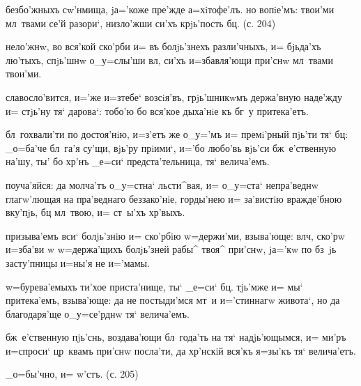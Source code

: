 безбо'жныхъ сw'нмища, jа='коже пре'жде а=хiтофе'лъ. но 
вопiе'мъ: твои'ми мл~твами се'й разори`, низло'жши си'хъ 
крjь'пость бц. (с. 204)

нело'жнw, во вся'кой ско'рби и= въ болjь'знехъ 
разли'чныхъ, и= бjьда'хъ лю'тыхъ, спjь'шнw о_у=слы'ши 
вл, си'хъ и=збавля'ющи при'снw мл~твами твои'ми.

славосло'вится, и='же и=з\ъ тебе` возсiя'въ, грjь'шникwмъ 
держа'вную наде'жду и= стjь'ну тя` дарова`: тобо'ю бо 
вся'кое дыха'нiе къ бг~у притека'етъ.


бл~гохвали'ти по достоя'нiю, и=з'етъ же о_у='мъ 
и= премi'рный пjь'ти тя` бц: _о=ба'че бл~га'я су'щи, 
вjь'ру прiими`, и='бо любо'вь вjь'си бж~е'ственную на'шу, 
ты' бо хр'нъ _е=си` предста'тельница, тя` 
велича'емъ.

поуча'яйся: да молча'тъ о_у=стна` льсти^вая, и= о_у=ста` 
непра'веднw глагw'лющая на пра'веднаго беззако'нiе, 
горды'нею и= за'вистiю вражде'бною вку'пjь, бц 
мл~твою, и= ст~ы'хъ хр'выхъ.

призыва'емъ вси` болjь'знiю и= ско'рбiю w=держи'ми, 
взыва'юще: вл ч, ско'рw и=зба'ви w\т 
w=держа'щихъ болjь'зней рабы^ твоя^ при'снw, jа='кw по 
бз~jь засту'пницы и=ны'я не и='мамы.

w=бурева'емыхъ ти'хое приста'нище, ты` _е=си` бц. 
тjь'мже и= мы` притека'емъ, взыва'юще: да не постыди'мся 
мт~и и='стиннагw живота`, но да благодаря'ще о_у=се'рднw 
тя` велича'емъ.

бж~е'ственную пjь'снь, воздава'ющи бл~года'ть на тя` 
надjь'ющымся, и= ми'ръ и=спроси` цр~квамъ при'снw 
посла'ти, да хр'нскiй вся'къ я=зы'къ тя` велича'етъ.

_о=бы'чно, и= w'стъ. (с. 205)
